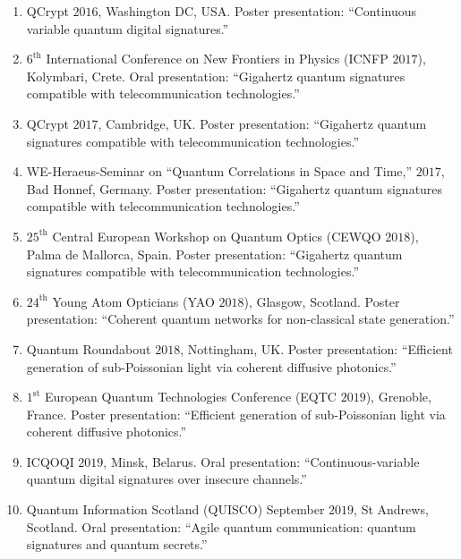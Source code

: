\begin{enumerate}
\item QCrypt $2016$, Washington DC, USA. Poster presentation: ``Continuous variable quantum digital signatures.''
\item $6^{\text{th}}$ International Conference on New Frontiers in Physics (ICNFP $2017$), Kolymbari, Crete. Oral presentation: ``Gigahertz quantum signatures compatible with telecommunication technologies.''
\item QCrypt $2017$, Cambridge, UK. Poster presentation: ``Gigahertz quantum signatures compatible with telecommunication technologies.''
\item WE-Heraeus-Seminar on ``Quantum Correlations in Space and Time,'' $2017$, Bad Honnef, Germany. Poster presentation: ``Gigahertz quantum signatures compatible with telecommunication technologies.''
\item $25^{\text{th}}$ Central European Workshop on Quantum Optics (CEWQO $2018$), Palma de Mallorca, Spain. Poster presentation: ``Gigahertz quantum signatures compatible with telecommunication technologies.''
\item $24^{\text{th}}$ Young Atom Opticians (YAO $2018$), Glasgow, Scotland. Poster presentation: ``Coherent quantum networks for non-classical state generation.''
\item Quantum Roundabout $2018$, Nottingham, UK. Poster presentation: ``Efficient generation of sub-Poissonian light via coherent diffusive photonics.''
\item $1^{\text{st}}$ European Quantum Technologies Conference (EQTC $2019$), Grenoble, France. Poster presentation: ``Efficient generation of sub-Poissonian light via coherent diffusive photonics.''
\item ICQOQI $2019$, Minsk, Belarus. Oral presentation: ``Continuous-variable quantum digital signatures over insecure channels.''
\item Quantum Information Scotland (QUISCO) September $2019$, St Andrews, Scotland. Oral presentation: ``Agile quantum communication: quantum signatures and quantum secrets.''
\end{enumerate}




